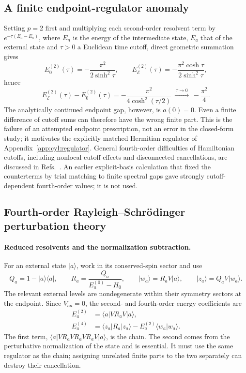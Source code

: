 \documentclass[11pt,a4paper]{article}
\numberwithin{equation}{section}
\newcommand{\ket}[1]{\lvert#1\rangle}
\begin{document}
\subsection{A finite endpoint-regulator anomaly}\label{app:cyl:anomaly}
Setting $p=2$ first and multiplying each second-order resolvent term by $e^{-\tau(E_n-E_a)}$, where $E_n$ is the energy
of the intermediate state, $E_a$ that of the external state and $\tau>0$ a Euclidean time cutoff, direct geometric
summation gives
\begin{equation}
 E_0^{(2)}(\tau)=-\frac{\pi^2}{2\sinh^2\tau},\qquad
 E_{\mathcal E}^{(2)}(\tau)=-\frac{\pi^2\cosh\tau}{2\sinh^2\tau},
\end{equation}
hence
\begin{equation}
 E_{\mathcal E}^{(2)}(\tau)-E_0^{(2)}(\tau)=-\frac{\pi^2}{4\cosh^2(\tau/2)}\ \xrightarrow{\ \tau\to0\ }\ -\frac{\pi^2}{4}.
\end{equation}
The analytically continued endpoint gap, however, is $a(0)=0$. Even a finite difference of cutoff sums can therefore
have the wrong finite part. This is the failure of an attempted endpoint prescription, not an error in the closed-form
study; it motivates the explicitly matched Hermitian regulator of Appendix~\ref{app:cyl:regulator}. General fourth-order
difficulties of Hamiltonian cutoffs, including nonlocal cutoff effects and disconnected cancellations, are discussed in
Refs.~\cite{EliasMiro:2021,EliasMiro:2022}. An earlier explicit-basis calculation that fixed the counterterms by trial
matching to finite spectral gaps gave strongly cutoff-dependent fourth-order values; it is not used.

\subsection{Fourth-order Rayleigh--Schr\"odinger perturbation theory}\label{app:cyl:rs}
\paragraph{Reduced resolvents and the normalization subtraction.} For an external state $\ket a$, work in its
conserved-spin sector and use
\begin{equation}
 Q_a=1-\ket a\langle a\rvert,\qquad R_a=\frac{Q_a}{E_a^{(0)}-H_0},\qquad \ket{w_a}=R_aV\ket a,\qquad
 \ket{z_a}=Q_aV\ket{w_a}.
\end{equation}
The relevant external levels are nondegenerate within their symmetry sectors at the endpoint. Since $V_{aa}=0$, the
second- and fourth-order energy coefficients are
\begin{align}
 E_a^{(2)}&=\langle a\rvert VR_aV\ket a,\\
 E_a^{(4)}&=\langle z_a\rvert R_a\ket{z_a}-E_a^{(2)}\langle w_a\vert w_a\rangle.
 \label{eq:cyl:RS4}
\end{align}
The first term, $\langle a\rvert VR_aVR_aVR_aV\ket a$, is the chain. The second comes from the perturbative
normalization of the state and is essential. It must use the same regulator as the chain; assigning unrelated finite
parts to the two separately can destroy their cancellation.
\end{document}
